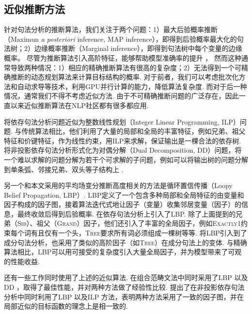 \subsection{近似推断方法}
针对句法分析的推断算法，我们关注于两个问题：1）最大后验概率推断（Maximun \textit{a posteriori} inference, MAP inference），即得到后验概率最大化的句法树；2）边缘概率推断（Marginal inference），即得到句法树中每个变量的边缘概率。
尽管为推断算法引入高阶特征，能够帮助模型准确率的提升 \citep{mcdonald-pereira-2006-online,carreras-2007-experiments,koo-collins-2010-efficient,ma-zhao-2012-fourth}，
然而这种通常导致两种情况：1）相应的精确推断算法有很高的复杂度；2）无法得到一个可精确推断的动态规划算法来计算目标结构的概率.
对于前者，我们可以考虑批次化方法和自动求导等技术，利用GPU并行计算的能力，降低算法复杂度.
而对于后一种情况，通常我们不得不考虑近似方法.
由于不可精确推断问题的广泛存在，因此一直以来近似推断算法在NLP社区都有很多都应用.

\citet{martins-etal-2009-concise}将依存句法分析问题近似为整数线性规划（Integer Linear Programming, ILP）问题.
与传统算法相比，他们利用了大量的局部和全局的丰富特征，例如兄弟、祖父特征和价键特征，作为线性约束，用ILP来求解，保证输出是一棵合法的依存树.
\citet{koo-etal-2010-dual}将非投影依存句法分析形式化为对偶分解（Dual Decomposition, DD）问题，将一个难以求解的问题分解为若干个可求解的子问题，例如可以将输出树的问题分解到单条弧、邻接兄弟、双头等子结构上 \citep{martins-etal-2011-dual}.

另一个和本文采用的平均场变分推断高度相关的方法是循环置信传播（Loopy Belief Propagation, LBP）.
LBP定义了一个包含多种局部和全局特征的由变量和因子构成的因子图，接着算法迭代式地让因子（变量）收集邻居变量（因子）的信息，最终收敛后得到后验概率.
\citet{smith-eisner-2008-dependency,gormley-etal-2015-approximation}在依存句法分析上引入了LBP.
除了上面提到的兄弟（\textsc{Sib}）、祖父（\textsc{Grand}）因子，他们还引入了丰富的全局因子，例如\textsc{Exactly1}约束每个词有且仅有一个头，\textsc{Tree}要求所有词必须组成一棵树等等.
\citet{naradowsky-etal-2012-grammarless}将LBP引入到了成分句法分析，也采用了类似的高阶因子（如\textsc{Tree}）在成分句法上的变体.
与精确算法相比，LBP可以用可接受的复杂度引入大量全局因子，并为模型带来了可观的性能收益.

还有一些工作同时使用了上述的近似算法.
\citet{auli-lopez-2011-comparison}在组合范畴文法中同时采用了LBP \citep{smith-eisner-2008-dependency}以及DD \citep{koo-etal-2010-dual}，取得了最佳性能，并对两种方法做了经验性比较.
\citet{martins-etal-2010-turbo}提出了在非投影依存句法分析中同时利用了LBP \citep{smith-eisner-2008-dependency}以及ILP \citep{martins-etal-2009-concise}方法，表明两种方法采用了一致的因子图，并在局部近似的目标函数的理念上是相一致的.

